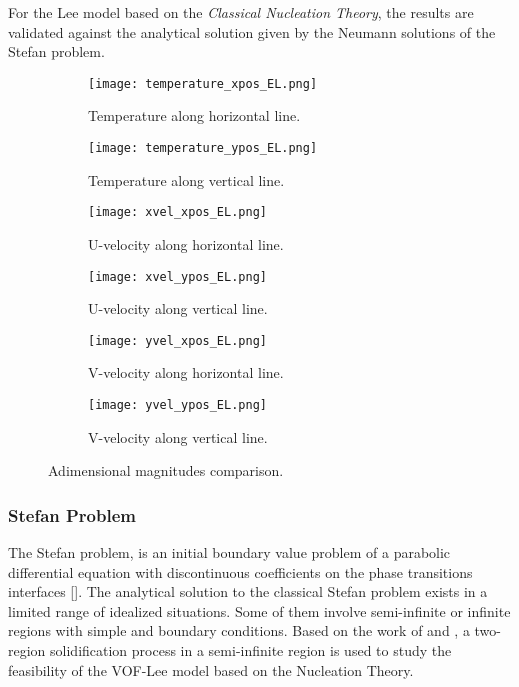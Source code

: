 For the Lee model based on the \textit{Classical Nucleation Theory}, the results are validated against the analytical solution given by the Neumann solutions of the Stefan problem.
\begin{figure}[h!]
	\begin{subfigure}{0.50\textwidth}
		\centering
		\texttt{[image: temperature\_xpos\_EL.png]}\hfill
		\caption{Temperature along horizontal line.} \label{3.5a}
	\end{subfigure}
	\hfill
	\begin{subfigure}{0.50\textwidth}
		\centering
		\texttt{[image: temperature\_ypos\_EL.png]}	
		\caption{Temperature along vertical line.}\label{3.5b}
	\end{subfigure}
	\begin{subfigure}{0.50\textwidth}
		\texttt{[image: xvel\_xpos\_EL.png]}\hfill
		\caption{U-velocity along horizontal line.}\label{3.5c}
	\end{subfigure}
	\begin{subfigure}{0.50\textwidth}
		\texttt{[image: xvel\_ypos\_EL.png]}	
		\caption{U-velocity along vertical line.}\label{3.5d}
	\end{subfigure}
	\begin{subfigure}{0.50\textwidth}
		\texttt{[image: yvel\_xpos\_EL.png]}\hfill	
		\caption{V-velocity along horizontal line.}\label{3.5e}
	\end{subfigure}
	\begin{subfigure}{0.50\textwidth}
		\texttt{[image: yvel\_ypos\_EL.png]}	
		\caption{V-velocity along vertical line.}\label{3.5f}
	\end{subfigure}
	\caption{Adimensional magnitudes comparison.}
	\label{3.5}
\end{figure}

\subsubsection{Stefan Problem}
The Stefan problem, is an initial boundary value problem of a parabolic differential equation with discontinuous coefficients on the phase transitions interfaces [\cite{vasilyev_vasilyeva_2020}]. The analytical solution to the classical Stefan problem exists in a limited range of idealized situations. Some of them involve semi-infinite or infinite regions with simple and boundary conditions. Based on the work of \cite{vasilyev_vasilyeva_2020} and \cite{zhao_zhao_xu_2018}, a two-region solidification process in a semi-infinite region is used to study the feasibility of the VOF-Lee model based on the Nucleation Theory.
